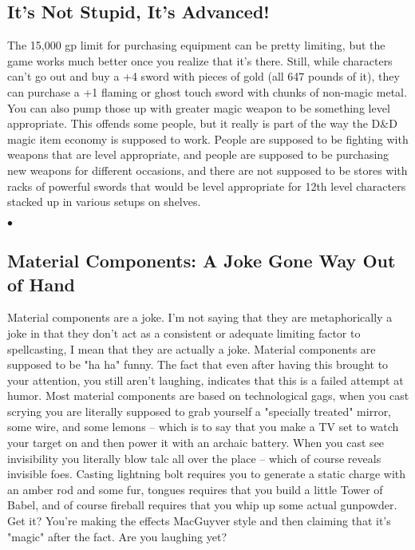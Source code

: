 \subsection{It's Not Stupid, It's Advanced!}

The 15,000 gp limit for purchasing equipment can be pretty limiting, but the game works much better once you realize that it's there. Still, while characters can't go out and buy a +4 sword with pieces of gold (all 647 pounds of it), they can purchase a +1 flaming or ghost touch sword with chunks of non-magic metal. You can also pump those up with greater magic weapon to be something level appropriate. This offends some people, but it really is part of the way the D\&D magic item economy is supposed to work. People are supposed to be fighting with weapons that are level appropriate, and people are supposed to be purchasing new weapons for different occasions, and there are not supposed to be stores with racks of powerful swords that would be level appropriate for 12th level characters stacked up in various setups on shelves.

\begin{list}{$\bullet$}{\itemspace}
\end{list}


\subsection{Material Components: A Joke Gone Way Out of Hand}

Material components are a joke. I'm not saying that they are metaphorically a joke in that they don't act as a consistent or adequate limiting factor to spellcasting, I mean that they are actually a joke. Material components are supposed to be "ha ha" funny. The fact that even after having this brought to your attention, you still aren't laughing, indicates that this is a failed attempt at humor. Most material components are based on technological gags, when you cast scrying you are literally supposed to grab yourself a "specially treated" mirror, some wire, and some lemons -- which is to say that you make a TV set to watch your target on and then power it with an archaic battery. When you cast see invisibility you literally blow talc all over the place -- which of course reveals invisible foes. Casting lightning bolt requires you to generate a static charge with an amber rod and some fur, tongues requires that you build a little Tower of Babel, and of course fireball requires that you whip up some actual gunpowder. Get it? You're making the effects MacGuyver style and then claiming that it's "magic" after the fact. Are you laughing yet?

